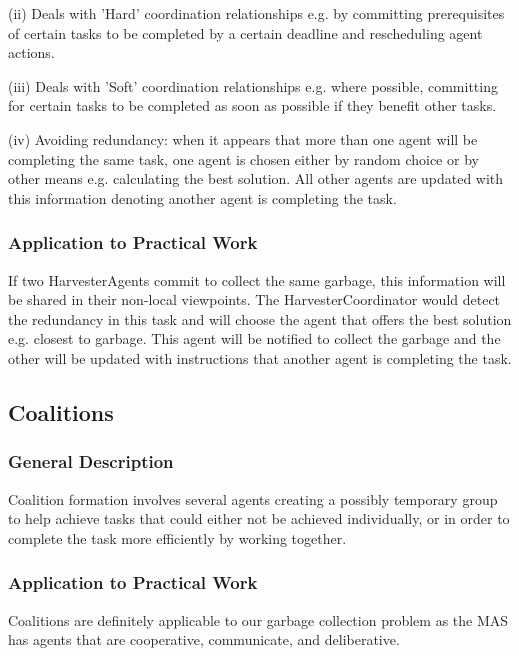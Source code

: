 (ii) Deals with 'Hard' coordination relationships e.g. by committing prerequisites of certain tasks to be completed by a certain deadline and rescheduling agent actions. 

(iii) Deals with 'Soft' coordination relationships e.g. where possible, committing for certain tasks to be completed as soon as possible if they benefit other tasks. 

(iv) Avoiding redundancy:  when it appears that more than one agent will be completing the same task, one agent is chosen either by random choice or by other means e.g. calculating the best solution. All other agents are updated with this information denoting another agent is completing the task. 

\subsubsection{Application to Practical Work}

If two HarvesterAgents commit to collect the same garbage, this information will be shared in their non-local viewpoints. The HarvesterCoordinator would detect the redundancy in this task and will choose the agent that offers the best solution e.g. closest to garbage.  This agent will be notified to collect the garbage and the other will be updated with instructions that another agent is completing the task. 



\subsection{Coalitions}

\subsubsection{General Description}

Coalition formation involves several agents creating a possibly temporary group to help achieve tasks that could either not be achieved individually, or in order to complete the task more efficiently by working together.

\subsubsection{Application to Practical Work}

Coalitions are definitely applicable to our garbage collection problem as the MAS has agents that are cooperative, communicate, and deliberative.
 
